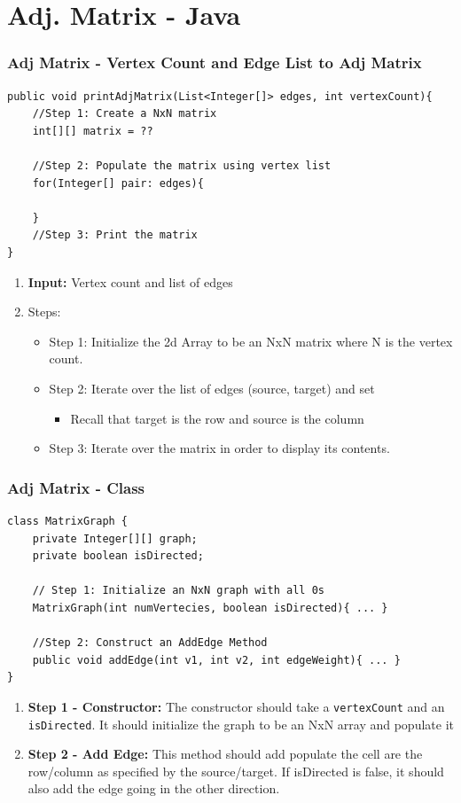 \documentclass{beamer}
\begin{document}
\section{Adj. Matrix - Java}
\begin{frame}[fragile]
    \frametitle{Adj Matrix - Vertex Count and Edge List to Adj Matrix}
    \begin{lstlisting}[basicstyle=\scriptsize, frame=trBL]
public void printAdjMatrix(List<Integer[]> edges, int vertexCount){
    //Step 1: Create a NxN matrix 
    int[][] matrix = ??
    
    //Step 2: Populate the matrix using vertex list
    for(Integer[] pair: edges){
        
    }
    //Step 3: Print the matrix 
}
    \end{lstlisting}
    \begin{enumerate}
		\scriptsize
        \item \textbf{Input:} Vertex count and list of edges
        \item Steps:
            \begin{itemize}
				\scriptsize
                \item Step 1: Initialize the 2d Array to be an NxN matrix where N is the vertex count.
                \item Step 2: Iterate over the list of edges (source, target) and set 
                    \begin{itemize}
						\tiny
                        \item Recall that target is the row and source is the column
                    \end{itemize}
                \item Step 3: Iterate over the matrix in order to display its contents.
            \end{itemize}
    \end{enumerate}
\end{frame}

\begin{frame}[fragile]
    \frametitle{Adj Matrix - Class}
    \begin{lstlisting}[basicstyle=\scriptsize, frame=trBL]
class MatrixGraph {
    private Integer[][] graph;
    private boolean isDirected;
    
    // Step 1: Initialize an NxN graph with all 0s
    MatrixGraph(int numVertecies, boolean isDirected){ ... }
    
    //Step 2: Construct an AddEdge Method
    public void addEdge(int v1, int v2, int edgeWeight){ ... }
} 
    \end{lstlisting}
    \begin{enumerate}
		\scriptsize
        \item \textbf{Step 1 - Constructor:} The constructor should take a \lstinline|vertexCount| and an \lstinline|isDirected|. It should initialize the graph to be an NxN array and populate it 
        \item \textbf{Step 2 - Add Edge:} This method should add populate the cell are the row/column as specified by the source/target. If isDirected is false, it should also add the edge going in the other direction.
    \end{enumerate}
\end{frame}
\end{document}
